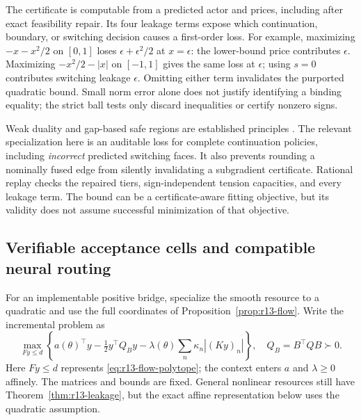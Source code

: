 The certificate is computable from a predicted actor and prices, including after exact feasibility repair. Its four leakage terms expose which continuation, boundary, or switching decision causes a first-order loss. For example, maximizing $-x-x^2/2$ on $[0,1]$ loses $\epsilon+\epsilon^2/2$ at $x=\epsilon$: the lower-bound price contributes $\epsilon$. Maximizing $-x^2/2-|x|$ on $[-1,1]$ gives the same loss at $\epsilon$; using $s=0$ contributes switching leakage $\epsilon$. Omitting either term invalidates the purported quadratic bound. Small norm error alone does not justify identifying a binding equality; the strict ball tests only discard inequalities or certify nonzero signs.

Weak duality and gap-based safe regions are established principles \citep{BoydVandenberghe2004,Fercoq2015}. The relevant specialization here is an auditable loss for complete continuation policies, including \emph{incorrect} predicted switching faces. It also prevents rounding a nominally fused edge from silently invalidating a subgradient certificate. Rational replay checks the repaired tiers, sign-independent tension capacities, and every leakage term. The bound can be a certificate-aware fitting objective, but its validity does not assume successful minimization of that objective.

\subsection{Verifiable acceptance cells and compatible neural routing}\label{sec:r13-cells}
For an implementable positive bridge, specialize the smooth resource to a quadratic and use the full coordinates of Proposition~\ref{prop:r13-flow}. Write the incremental problem as
\begin{equation}\label{eq:r13-cell-problem}
 \max_{Fy\leq d}\left\{a(\theta)^\top y-\tfrac12y^\top Q_B y
                   -\lambda(\theta)\sum_n\kappa_n|(Ky)_n|\right\},
 \quad Q_B=B^\top QB\succ0.
\end{equation}
Here $Fy\leq d$ represents \eqref{eq:r13-flow-polytope}; the context enters $a$ and $\lambda\geq0$ affinely. The matrices and bounds are fixed. General nonlinear resources still have Theorem~\ref{thm:r13-leakage}, but the exact affine representation below uses the quadratic assumption.

